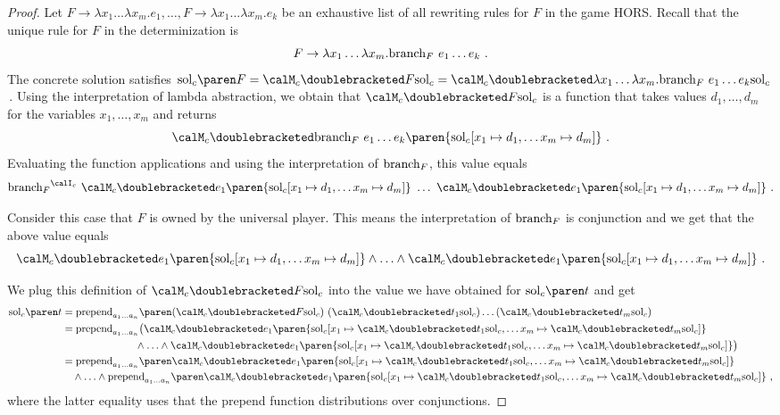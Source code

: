 \documentclass[../../diss.tex]{subfiles}
\begin{document}
\begin{proof}
    Let $F \to \lambda x_1 \ldots \lambda x_m . e_1, \ldots, F \to \lambda x_1 \ldots \lambda x_m . e_k$ be an exhaustive list of all rewriting rules for $F$ in the game HORS.\@
    Recall that the unique rule for $F$ in the determinization is
    \[
        F \to \lambda x_1 \ldots \lambda x_m . \text{branch}_F\ e_1 \ldots e_k
        \ .
    \]
    The concrete solution satisfies $\solc{F} = \semc{F}{\solc}  =  \semc{\lambda x_1 \ldots \lambda x_m . \brancht_F\ e_1 \ldots e_k}{\solc}$\,.
    Using the interpretation of lambda abstraction, we obtain that $\semc{F}{\solc}$ is a function that takes values $d_1, \ldots, d_m$ for the variables $x_1, \ldots, x_m$ and returns
    \[
        \semc{\brancht_F\ e_1 \ldots e_k}{ \paren{\solc [x_1 \mapsto d_1, \ldots x_m \mapsto d_m]} }
        \ .
    \]
    Evaluating the function applications and using the interpretation of $\text{branch}_F$, this value equals
    \[
        {\brancht_F}^{\interpretationc}
        \appl
        \semc{e_1}{ \paren{\solc [x_1 \mapsto d_1, \ldots x_m \mapsto d_m]} }
        \appl
        \ldots
        \appl
        \semc{e_1}{ \paren{\solc [x_1 \mapsto d_1, \ldots x_m \mapsto d_m]} }
        \ .
    \]

    Consider this case that $F$ is owned by the universal player.
    This means the interpretation of $\text{branch}_F$ is conjunction and we get
     that the above value equals
    \[
        \semc{e_1}{ \paren{\solc [x_1 \mapsto d_1, \ldots x_m \mapsto d_m]} }
        \wedge
        \ldots
        \wedge
        \semc{e_1}{ \paren{\solc [x_1 \mapsto d_1, \ldots x_m \mapsto d_m]} }
        \ .
    \]

    We plug this definition of $\semc{F}{\solc}$ into the value we have obtained for $\solc{t}$ and get
    \begin{align*}
        \solc{t}
        &=
        \prepend{a_1 \ldots a_n}%
        {%
            (\semc{F}{\solc})
            \appl
            (\semc{t_1}{\solc})%
            \ldots
            (\semc{t_m}{\solc})
        }%
        \\
        &=
        \textprepend_{a_1 \ldots a_n}%
        \big(%
            \semc{e_1}{ \paren{\solc [x_1 \mapsto \semc{t_1}{\solc}, \ldots x_m \mapsto \semc{t_m}{\solc}]} }
        \\
        & \qquad\qquad\qquad\quad
            \wedge
            \ldots
            \wedge
            \semc{e_1}{ \paren{\solc [x_1 \mapsto \semc{t_1}{\solc}, \ldots x_m \mapsto \semc{t_m}{\solc}]} }
        \big)%
        \\
        &=
        \prepend{a_1 \ldots a_n}%
        {%
        \semc{e_1}{ \paren{\solc [x_1 \mapsto \semc{t_1}{\solc}, \ldots x_m \mapsto \semc{t_m}{\solc}]} }
        }
        \\
        & \quad
            \wedge
            \ldots
            \wedge
            \prepend{a_1 \ldots a_n}%
            {%
            \semc{e_1}{ \paren{\solc [x_1 \mapsto \semc{t_1}{\solc}, \ldots x_m \mapsto \semc{t_m}{\solc}]} }
            }
        \ ,
    \end{align*}
    where the latter equality uses that the prepend function distributions over conjunctions.


\end{proof}
\end{document}
